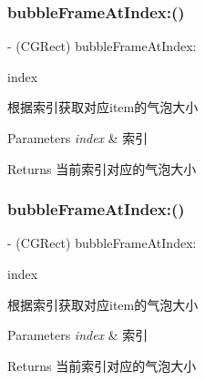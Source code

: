 \subsubsection{\texorpdfstring{bubble\+Frame\+At\+Index\+:()}{bubbleFrameAtIndex:()}\hspace{0.1cm}{\footnotesize\ttfamily [1/3]}}
{\footnotesize\ttfamily -\/ (C\+G\+Rect) bubble\+Frame\+At\+Index\+: \begin{DoxyParamCaption}\item[{(N\+S\+U\+Integer)}]{index }\end{DoxyParamCaption}}

根据索引获取对应item的气泡大小


\begin{DoxyParams}{Parameters}
{\em index} & 索引\\
\hline
\end{DoxyParams}
\begin{DoxyReturn}{Returns}
当前索引对应的气泡大小 
\end{DoxyReturn}
\mbox{\label{interface_v_t_menu_bar_a917d8914840aa425cd46b272b80854a8}} 
\subsubsection{\texorpdfstring{bubble\+Frame\+At\+Index\+:()}{bubbleFrameAtIndex:()}\hspace{0.1cm}{\footnotesize\ttfamily [2/3]}}
{\footnotesize\ttfamily -\/ (C\+G\+Rect) bubble\+Frame\+At\+Index\+: \begin{DoxyParamCaption}\item[{(N\+S\+U\+Integer)}]{index }\end{DoxyParamCaption}}

根据索引获取对应item的气泡大小


\begin{DoxyParams}{Parameters}
{\em index} & 索引\\
\hline
\end{DoxyParams}
\begin{DoxyReturn}{Returns}
当前索引对应的气泡大小 
\end{DoxyReturn}
\mbox{\label{interface_v_t_menu_bar_a917d8914840aa425cd46b272b80854a8}} 
